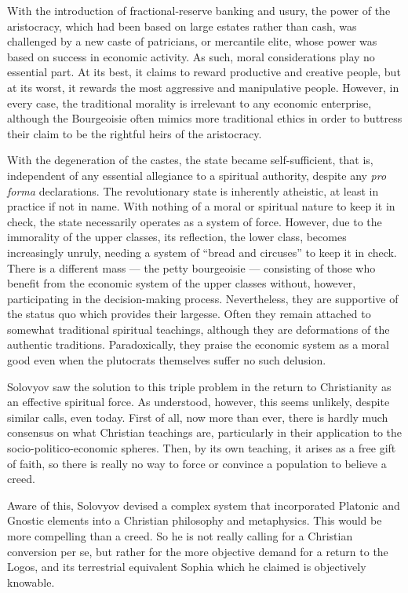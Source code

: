 With the introduction of fractional-reserve banking and usury, the power of the aristocracy, which had been based on large estates rather than cash, was challenged by a new caste of patricians, or mercantile elite, whose power was based on success in economic activity. As such, moral considerations play no essential part. At its best, it claims to reward productive and creative people, but at its worst, it rewards the most aggressive and manipulative people. However, in every case, the traditional morality is irrelevant to any economic enterprise, although the Bourgeoisie often mimics more traditional ethics in order to buttress their claim to be the rightful heirs of the aristocracy.

With the degeneration of the castes, the state became self-sufficient, that is, independent of any essential allegiance to a spiritual authority, despite any \emph{pro forma} declarations. The revolutionary state is inherently atheistic, at least in practice if not in name. With nothing of a moral or spiritual nature to keep it in check, the state necessarily operates as a system of force. However, due to the immorality of the upper classes, its reflection, the lower class, becomes increasingly unruly, needing a system of ``bread and circuses'' to keep it in check. There is a different mass --- the petty bourgeoisie --- consisting of those who benefit from the economic system of the upper classes without, however, participating in the decision-making process. Nevertheless, they are supportive of the status quo which provides their largesse. Often they remain attached to somewhat traditional spiritual teachings, although they are deformations of the authentic traditions. Paradoxically, they praise the economic system as a moral good even when the plutocrats themselves suffer no such delusion.

Solovyov saw the solution to this triple problem in the return to Christianity as an effective spiritual force. As understood, however, this seems unlikely, despite similar calls, even today. First of all, now more than ever, there is hardly much consensus on what Christian teachings are, particularly in their application to the socio-politico-economic spheres. Then, by its own teaching, it arises as a free gift of faith, so there is really no way to force or convince a population to believe a creed.

Aware of this, Solovyov devised a complex system that incorporated Platonic and Gnostic elements into a Christian philosophy and metaphysics. This would be more compelling than a creed. So he is not really calling for a Christian conversion per se, but rather for the more objective demand for a return to the Logos, and its terrestrial equivalent Sophia which he claimed is objectively knowable.


